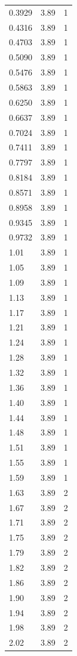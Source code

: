 \begin{longtable}{lrr}
  0.3929 & 3.89 & 1 \\
  0.4316 & 3.89 & 1 \\
  0.4703 & 3.89 & 1 \\
  0.5090 & 3.89 & 1 \\
  0.5476 & 3.89 & 1 \\
  0.5863 & 3.89 & 1 \\
  0.6250 & 3.89 & 1 \\
  0.6637 & 3.89 & 1 \\
  0.7024 & 3.89 & 1 \\
  0.7411 & 3.89 & 1 \\
  0.7797 & 3.89 & 1 \\
  0.8184 & 3.89 & 1 \\
  0.8571 & 3.89 & 1 \\
  0.8958 & 3.89 & 1 \\
  0.9345 & 3.89 & 1 \\
  0.9732 & 3.89 & 1 \\
  1.01 & 3.89 & 1 \\
  1.05 & 3.89 & 1 \\
  1.09 & 3.89 & 1 \\
  1.13 & 3.89 & 1 \\
  1.17 & 3.89 & 1 \\
  1.21 & 3.89 & 1 \\
  1.24 & 3.89 & 1 \\
  1.28 & 3.89 & 1 \\
  1.32 & 3.89 & 1 \\
  1.36 & 3.89 & 1 \\
  1.40 & 3.89 & 1 \\
  1.44 & 3.89 & 1 \\
  1.48 & 3.89 & 1 \\
  1.51 & 3.89 & 1 \\
  1.55 & 3.89 & 1 \\
  1.59 & 3.89 & 1 \\
  1.63 & 3.89 & 2 \\
  1.67 & 3.89 & 2 \\
  1.71 & 3.89 & 2 \\
  1.75 & 3.89 & 2 \\
  1.79 & 3.89 & 2 \\
  1.82 & 3.89 & 2 \\
  1.86 & 3.89 & 2 \\
  1.90 & 3.89 & 2 \\
  1.94 & 3.89 & 2 \\
  1.98 & 3.89 & 2 \\
  2.02 & 3.89 & 2 \\

\end{longtable}
